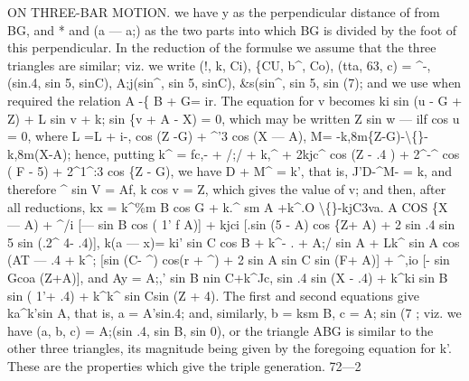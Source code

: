 \documentclass[12pt,a4paper]{article}
\begin{document}
ON THREE-BAR MOTION.
we
have
y
as
the
perpendicular
distance
of
from
BG,
and
*
and
(a --- a;)
as
the
two
parts
into which BG
is divided by the
foot
of
this perpendicular.
In
the reduction
of the formulse we assume
that the three
triangles are similar;
viz. we
write
(\guillemotleft{}!, k,
Ci),
\{CU,
b\textasciicircum{},
Co),
(tta,
63, c)
= \textasciicircum{}-, (sin.4,
sin 5, sinC), A;j(sin\textasciicircum{}, sin 5, sinC), \&s(sin\textasciicircum{},
sin 5, sin (7);
and we use when required
the
relation A -\{ B + G= ir.
The equation
for
v becomes
ki sin (u - G + Z) + L sin v + k; sin \{v + A - X) = 0,
which may be written
Z sin w --- ilf cos u = 0,
where
L =L + i-, cos (Z -G) + \textasciicircum{}'3 cos (X --- A),
M=
-k,8m\{Z-G)-\textbackslash\{\}-k,8m(X-A);
hence, putting
k\textasciicircum{} = fc,- + /;/ + k,\textasciicircum{} + 2kjc\textasciicircum{} cos (Z - .4 ) + 2\textasciicircum{}-\textasciicircum{} cos ( F - 5) + 2\textasciicircum{}1\textasciicircum{}:3 cos \{Z - G),
we have D + M\textasciicircum{} = k', that
is, \textbullet{}J'D-\textasciicircum{}M- = k, and therefore
\textasciicircum{} sin V = Af,
k cos v = Z,
which gives the
value of v;
and
then,
after
all
reductions,
kx = k\textasciicircum{}\%m B cos G + k.\textasciicircum{} sm A +k\textasciicircum{}.O \textbackslash\{\}-kjC3\guillemotright{}va. A COS \{X --- A)
+ \textasciicircum{}/i [--- sin B cos ( 1' f A)]
+ kjci [.sin (5 - A) cos \{Z+ A) + 2 sin .4 sin 5 sin (.2\textasciicircum{} 4- .4)],
k(a --- x)= ki' sin C cos B + k\textasciicircum{}-
.
+ A;/ sin A + Lk\textasciicircum{} sin A cos (AT --- .4
+ k\textasciicircum{}; [sin (C- \textasciicircum{}) cos(r + \textasciicircum{}) + 2 sin A sin C sin (F+ A)]
+ \textasciicircum{},io [- sin Gcoa (Z+A)],
and
Ay = A;,' sin B nin C+k\textasciicircum{}Jc, sin .4 sin (X - .4) + k\textasciicircum{}ki sin B sin ( 1'+ .4) + k\textasciicircum{}k\textasciicircum{} sin Csin (Z + 4).
The
first and second equations give ka\textasciicircum{}k'sin A, that
is, a = A'sin.4;
and,
similarly,
b = ksm B,
c = A; sin (7 ;
viz. we have
(a,
b,
c) = A;(sin .4,
sin B,
sin 0),
or
the
triangle ABG
is
similar
to the other three
triangles,
its magnitude being given
by
the
foregoing
equation
for
k'.
These
are
the
properties
which
give
the
triple
generation.
72---2
\end{document}
